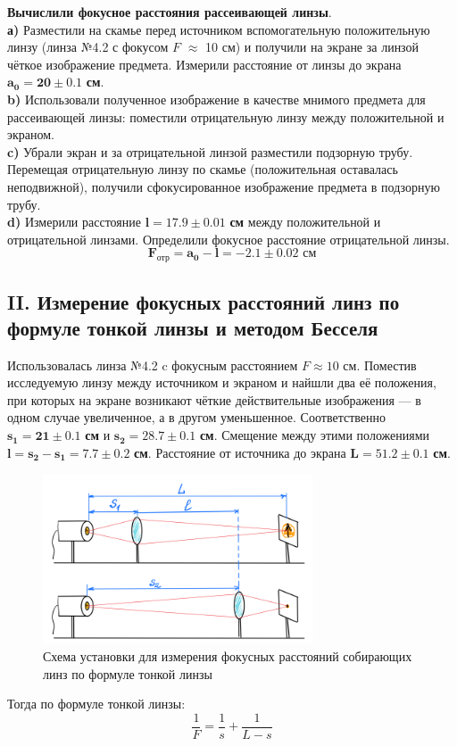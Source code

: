 \indent \textbf{Вычислили фокусное расстояния рассеивающей линзы}.\\
\textbf{а)} Разместили на скамье перед источником вспомогательную положительную линзу (линза №4.2 с фокусом $F$ $\approx$ 10 см) и получили на экране за линзой чёткое изображение предмета. Измерили расстояние от линзы до экрана $\bm{a_0 = 20\pm0.1 }$ \textbf{см}. \\
\textbf{b)} Использовали полученное изображение в качестве мнимого предмета для рассеивающей линзы: поместили отрицательную линзу между положительной и экраном. \\
\textbf{c)} Убрали экран и за отрицательной линзой разместили подзорную трубу. Перемещая отрицательную линзу по скамье (положительная оставалась неподвижной), получили сфокусированное изображение предмета в подзорную трубу. \\
\textbf{d)} Измерили расстояние $\bm{l = 17.9 \pm 0.01 }$\textbf{ см} между положительной и отрицательной линзами. Определили фокусное расстояние отрицательной линзы. \\
\begin{equation}
    \bm{F_{\text{отр}} = a_0 - l = -2.1 \pm 0.02} \textbf{ см}
\end{equation}

\subsection*{II. Измерение фокусных расстояний линз по формуле тонкой линзы и
методом Бесселя}
Использовалась линза №4.2 c фокусным расстоянием $F \approx 10$ {см}.
Поместив исследуемую линзу между источником и экраном и найшли два её
положения, при которых на экране возникают чёткие действительные изображения
— в одном случае увеличенное, а в другом уменьшенное. Соответственно $\bm{s_1 = 21\pm0.1}$ \textbf{см} и $\bm{s_2 = 28.7 \pm 0.1}$ \textbf{см}. Смещение между этими положениями $\bm{l = s_2 - s_1 = 7.7 \pm 0.2}$ \textbf{см}. Расстояние от источника до экрана $\bm{L = 51.2 \pm 0.1}$ \textbf{см}.
\begin{figure}[h!]
    \centering
    \includegraphics[width=8cm]{images/setup2.png}
    \caption{Схема установки для измерения фокусных расстояний собирающих линз по формуле тонкой линзы}
\end{figure}
Тогда по формуле тонкой линзы:
\begin{equation}
    \frac{1}{F} = \frac{1}{s} + \frac{1}{L - s}
\end{equation}

